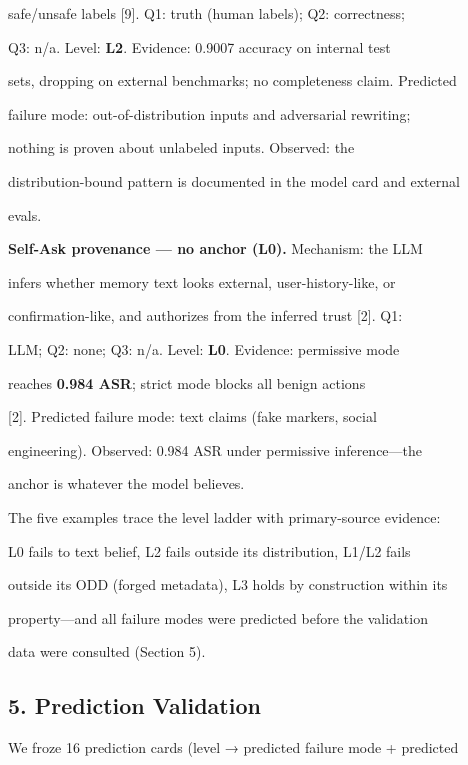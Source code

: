 \documentclass[

]{article}
\newcounter{none} %
\begin{document}
safe/unsafe labels {[}9{]}. Q1: truth (human labels); Q2: correctness;

Q3: n/a. Level: \textbf{L2}. Evidence: 0.9007 accuracy on internal test

sets, dropping on external benchmarks; no completeness claim. Predicted

failure mode: out-of-distribution inputs and adversarial rewriting;

nothing is proven about unlabeled inputs. Observed: the

distribution-bound pattern is documented in the model card and external

evals.



\textbf{Self-Ask provenance --- no anchor (L0).} Mechanism: the LLM

infers whether memory text looks external, user-history-like, or

confirmation-like, and authorizes from the inferred trust {[}2{]}. Q1:

LLM; Q2: none; Q3: n/a. Level: \textbf{L0}. Evidence: permissive mode

reaches \textbf{0.984 ASR}; strict mode blocks all benign actions

{[}2{]}. Predicted failure mode: text claims (fake markers, social

engineering). Observed: 0.984 ASR under permissive inference---the

anchor is whatever the model believes.



The five examples trace the level ladder with primary-source evidence:

L0 fails to text belief, L2 fails outside its distribution, L1/L2 fails

outside its ODD (forged metadata), L3 holds by construction within its

property---and all failure modes were predicted before the validation

data were consulted (Section 5).



\subsection{5. Prediction Validation}\label{prediction-validation}



We froze 16 prediction cards (level → predicted failure mode + predicted
\end{document}
